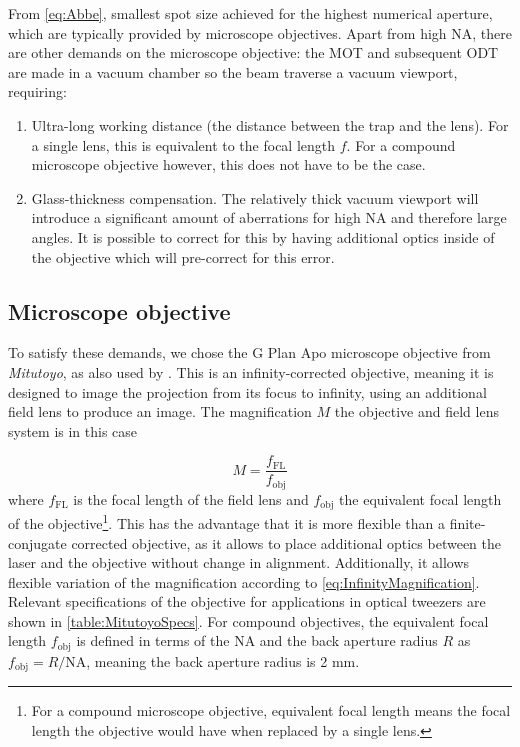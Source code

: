From \cref{eq:Abbe}, smallest spot size achieved for the highest numerical aperture, which are typically provided by microscope objectives. 
Apart from high NA, there are other demands on the microscope objective: the \ac{MOT} and subsequent \ac{ODT} are made in a vacuum chamber so the beam traverse a vacuum viewport, requiring:

\begin{enumerate}
	\item Ultra-long working distance (the distance between the trap and the lens). For a single lens, this is equivalent to the focal length $f$.
	For a compound microscope objective however, this does not have to be the case.
	
	\item Glass-thickness compensation. The relatively thick vacuum viewport will introduce a significant amount of aberrations for high NA and therefore large angles. It is possible to correct for this by having additional optics inside of the objective which will pre-correct for this error.
\end{enumerate}

\subsection{Microscope objective}

To satisfy these demands, we chose the G Plan Apo microscope objective from \textit{Mitutoyo}, as also used by \cite{Manuel2016,Ebadi2021}. 
This is an infinity-corrected objective, meaning it is designed to image the projection from its focus to infinity, using an additional field lens to produce an image.
The magnification $M$ the objective and field lens system is in this case 

\begin{equation}\label{eq:InfinityMagnification}
	M = \frac{
		f_{\text{FL}}
	}{
		f_{\text{obj}}
	}
\end{equation}
where $f_{\text{FL}}$ is the focal length of the field lens and $f_{\text{obj}}$ the equivalent focal length of the objective\footnote{For a compound microscope objective, equivalent focal length means the focal length the objective would have when replaced by a single lens.}.
This has the advantage that it is more flexible than a finite-conjugate corrected objective, as it allows to place additional optics between the laser and the objective without change in alignment.
Additionally, it allows flexible variation of the magnification according to \cref{eq:InfinityMagnification}.
Relevant specifications of the objective for applications in optical tweezers are shown in \cref{table:MitutoyoSpecs}. 
For compound objectives, the equivalent focal length $f_{\text{obj}}$ is defined in terms of the \ac{NA} and the back aperture radius $R$ as $f_{\text{obj}} = R / \text{NA}$, meaning the back aperture radius is 2 mm.

